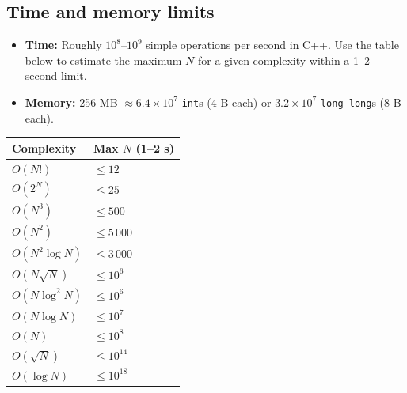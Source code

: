 \subsection{Time and memory limits}

\begin{itemize}
    \item \textbf{Time:} Roughly $10^8$–$10^9$ simple operations per second in C++. Use the table below to estimate the maximum $N$ for a given complexity within a 1–2 second limit.
    \item \textbf{Memory:} 256 MB $\approx 6.4 \times 10^7$ \texttt{int}s (4 B each) or $3.2 \times 10^7$ \texttt{long long}s (8 B each).
\end{itemize}

\begin{center}
\begin{tabular}{ll}
\toprule
\textbf{Complexity} & \textbf{Max $N$ (1–2 s)} \\
\midrule
$O(N!)$              & $\leq 12$         \\
$O(2^N)$             & $\leq 25$         \\
$O(N^3)$             & $\leq 500$        \\
$O(N^2)$             & $\leq 5\,000$     \\
$O(N^2 \log N)$      & $\leq 3\,000$     \\
$O(N \sqrt{N})$      & $\leq 10^6$       \\
$O(N \log^2 N)$      & $\leq 10^6$       \\
$O(N \log N)$        & $\leq 10^7$       \\
$O(N)$               & $\leq 10^8$       \\
$O(\sqrt{N})$        & $\leq 10^{14}$    \\
$O(\log N)$          & $\leq 10^{18}$    \\
\bottomrule
\end{tabular}
\end{center}
